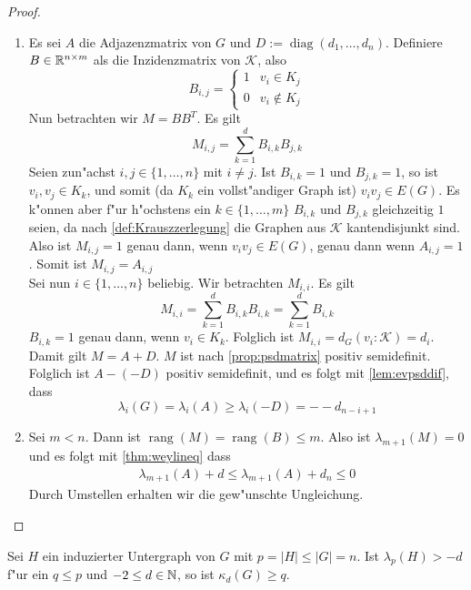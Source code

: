 \begin{proof}
  \begin{enumerate}[label=(\alph*)]
    \item Es sei $A$ die Adjazenzmatrix von $G$ und $D := \operatorname{diag}(d_1,\dots,d_n)$. Definiere $B\in{\mathbb{R}}^{n\times m}$ als die Inzidenzmatrix von $\mathcal K$, also $$B_{i,j} = \begin{cases}
        1 & v_i \in K_j \\ 0 & v_i \notin K_j
      \end{cases}$$ 
      Nun betrachten wir $M=BB^{T}$. Es gilt
      \[
        M_{i,j} = \sum\limits_{k=1}^{d}B_{i,k}B_{j,k}
      \]
      Seien zun"achst $i,j \in \{1,\dots,n\}$ mit $i\neq j$. Ist $B_{i,k} = 1$ und $B_{j,k} = 1$, so ist $v_i,v_j  \in K_k$, und somit (da $K_k$ ein vollst"andiger Graph ist) $v_iv_j\in E(G)$. Es k"onnen aber f"ur h"ochstens ein $k\in \{1,\dots,m\}$ $B_{i,k}$ und $B_{j,k}$ gleichzeitig $1$ seien, da nach \ref{def:Krauszzerlegung} die Graphen aus $\mathcal K$ kantendisjunkt sind. Also ist $M_{i,j}= 1 $ genau dann, wenn $v_iv_j\in E(G)$, genau dann wenn $A_{i,j} = 1$. Somit ist $M_{i,j}=A_{i,j}$\\
      Sei nun $i\in\{1,\dots,n\}$ beliebig. Wir betrachten $M_{i,i}$. Es gilt 
      \[
        M_{i,i} = \sum\limits_{k=1}^{d}B_{i,k}B_{i,k} = \sum\limits_{k=1}^{d} B_{i,k}
      \]
      $B_{i,k}=1$ genau dann, wenn $v_i \in K_k$. Folglich ist $M_{i,i}= d_G(v_i:\mathcal K)= d_i$. Damit gilt $M=A+D$. $M$ ist nach \ref{prop:psdmatrix} positiv semidefinit.
      Folglich ist $A- (-D)$ positiv semidefinit, und es folgt mit \ref{lem:evpsddif}, dass 
      \begin{equation*}
        \lambda_i(G) = \lambda_i(A) \geq \lambda_i(-D) =- -d_{n-i+1}
      \end{equation*}
    \item Sei $m<n$. Dann ist $\operatorname{rang}(M)= \operatorname{rang}(B) \leq m$. Also ist $\lambda_{m+1}(M) = 0$ und es folgt mit \ref{thm:weylineq} dass 
      \begin{align*}
        \lambda_{m+1}(A) + d \leq \lambda_{m+1}(A) + d_{n} \leq 0
      \end{align*}
      Durch Umstellen erhalten wir die gew"unschte Ungleichung.
  \end{enumerate}
\end{proof}
\begin{corollary}
  \label{cor:Korollar1}
  Sei $H$ ein induzierter Untergraph von $G$ mit $p = \left| H\right| \leq \left|G\right| = n$.
  Ist $\lambda_p (H) > -d $ f"ur ein $q \leq p$ und $-2 \leq d \in {\mathbb{N}}$, so ist $\kappa_d(G) \geq q$.
\end{corollary}
